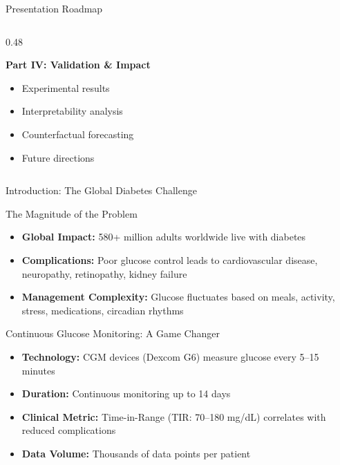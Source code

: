 \documentclass[aspectratio=169,xcolor=dvipsnames]{beamer}
\begin{document}
\begin{frame}{Presentation Roadmap}
\begin{columns}[t]
\begin{column}{0.48\textwidth}
            \vspace{0.3em}
            
            \begin{block}{\textbf{Part IV: Validation \& Impact}}
                \begin{itemize}
                    \item Experimental results
                    \item Interpretability analysis
                    \item Counterfactual forecasting
                    \item Future directions
                \end{itemize}
            \end{block}
        \end{column}
    \end{columns}
    
    \vspace{0.5em}
    
  
\end{frame}

\begin{frame}{Introduction: The Global Diabetes Challenge}
    \begin{block}{The Magnitude of the Problem}
        \begin{itemize}
            \item \textbf{Global Impact:} 580+ million adults worldwide live with diabetes
            \item \textbf{Complications:} Poor glucose control leads to cardiovascular disease, neuropathy, retinopathy, kidney failure
            \item \textbf{Management Complexity:} Glucose fluctuates based on meals, activity, stress, medications, circadian rhythms
        \end{itemize}
    \end{block}
    
    \begin{block}{Continuous Glucose Monitoring: A Game Changer}
        \begin{itemize}
            \item \textbf{Technology:} CGM devices (Dexcom G6) measure glucose every 5--15 minutes
            \item \textbf{Duration:} Continuous monitoring up to 14 days
            \item \textbf{Clinical Metric:} Time-in-Range (TIR: 70--180 mg/dL) correlates with reduced complications
            \item \textbf{Data Volume:} Thousands of data points per patient
        \end{itemize}
    \end{block}
\end{frame}
\end{document}
